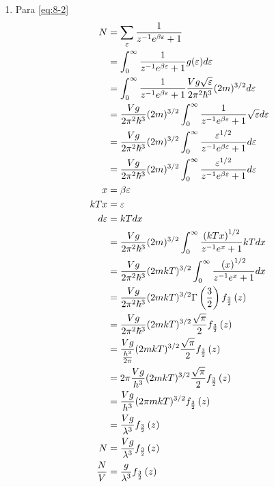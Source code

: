 \documentclass{report}
\begin{document}
\begin{enumerate}
  \item Para \ref{eq:8-2}
    \begin{align*}
      N &= \sum_{\varepsilon} \frac{1}{z^{-1}e^{\beta\varepsilon} + 1}\\
      &= \int_0^{\infty} \frac{1}{z^{-1}e^{\beta\varepsilon} + 1} g(\varepsilon) d\varepsilon\\
      &= \int_0^{\infty} \frac{1}{z^{-1}e^{\beta\varepsilon} + 1} \frac{V g \sqrt{\varepsilon}}{2\pi^2 \hbar^3} (2m)^{3/2} d\varepsilon\\
      &= \frac{V g }{2\pi^2 \hbar^3} (2m)^{3/2} \int_0^{\infty} \frac{1}{z^{-1}e^{\beta\varepsilon} + 1} \sqrt{\varepsilon} d\varepsilon\\
      &= \frac{V g }{2\pi^2 \hbar^3} (2m)^{3/2} \int_0^{\infty} \frac{\varepsilon^{1/2}}{z^{-1}e^{\beta\varepsilon} + 1}  d\varepsilon\\
      &= \frac{V g }{2\pi^2 \hbar^3} (2m)^{3/2} \int_0^{\infty} \frac{\varepsilon^{1/2}}{z^{-1}e^{\beta\varepsilon} + 1}  d\varepsilon\\
      x &= \beta\varepsilon\\
      kTx &= \varepsilon\\
      d\varepsilon &= kTdx\\
      &= \frac{V g }{2\pi^2 \hbar^3} (2m)^{3/2} \int_0^{\infty} \frac{\left(kTx\right)^{1/2}}{z^{-1}e^{x} + 1}  kTdx\\
      &= \frac{V g }{2\pi^2 \hbar^3} (2mkT)^{3/2} \int_0^{\infty} \frac{\left(x\right)^{1/2}}{z^{-1}e^{x} + 1}  dx\\
      &= \frac{V g }{2\pi^2 \hbar^3} (2mkT)^{3/2} \Gamma\left(\frac{3}{2}\right) f_{\frac{3}{2}}\left(z\right)\\
      &= \frac{V g }{2\pi^2 \hbar^3} (2mkT)^{3/2} \frac{\sqrt{\pi}}{2} f_{\frac{3}{2}}\left(z\right)\\
      &= \frac{V g }{\frac{h^3}{2\pi}} (2mkT)^{3/2} \frac{\sqrt{\pi}}{2} f_{\frac{3}{2}}\left(z\right)\\
      &= 2\pi\frac{V g }{h^3} (2mkT)^{3/2} \frac{\sqrt{\pi}}{2} f_{\frac{3}{2}}\left(z\right)\\
      &= \frac{V g }{h^3} (2\pi mkT)^{3/2} f_{\frac{3}{2}}\left(z\right)\\
      &= \frac{V g }{\lambda^3} f_{\frac{3}{2}}\left(z\right)\\
      N &= \frac{V g }{\lambda^3} f_{\frac{3}{2}}\left(z\right)\\
      \frac{N}{V} &= \frac{g}{\lambda^3} f_{\frac{3}{2}}\left(z\right)\\
    \end{align*}
\end{enumerate}
\end{document}
